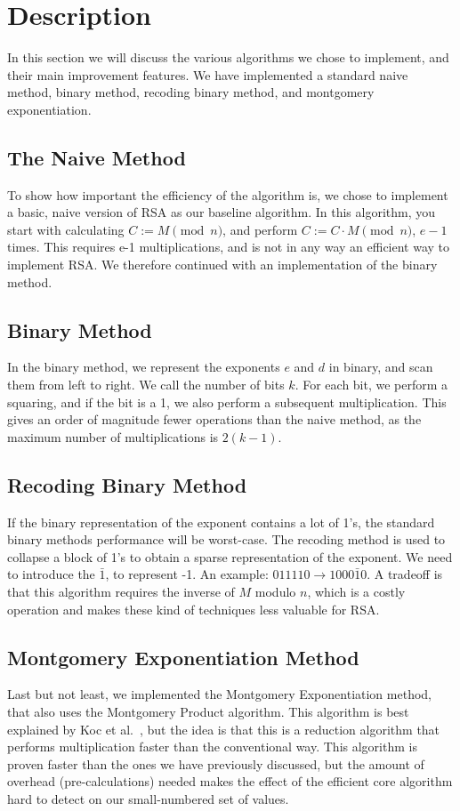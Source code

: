 \documentclass[twocolumn]{IEEEtran}
\begin{document}
\section{Description}
In this section we will discuss the various algorithms we chose to implement, and their main improvement features. We have implemented a standard naive method, binary method, recoding binary method, and montgomery exponentiation.

\subsection*{The Naive Method}
To show how important the efficiency of the algorithm is, we chose to implement a basic, naive version of RSA as our baseline algorithm. In this algorithm, you start with calculating $C := M \pmod{n}$, and perform $C := C \cdot M \pmod{n}$, $e-1$ times. This requires e-1 multiplications, and is not in any way an efficient way to implement RSA. We therefore continued with an implementation of the binary method.

\subsection*{Binary Method}
In the binary method, we represent the exponents $e$ and $d$ in binary, and scan them from left to right. We call the number of bits $k$. For each bit, we perform a squaring, and if the bit is a 1, we also perform a subsequent multiplication. This gives an order of magnitude fewer operations than the naive method, as the maximum number of multiplications is $2(k-1)$.

\subsection*{Recoding Binary Method}
If the binary representation of the exponent contains a lot of 1’s, the standard binary methods performance will be worst-case. The recoding method is used to collapse a block of 1’s to obtain a sparse representation of the exponent. We need to introduce the $\bar{1}$, to represent -1. An example: $011110 \rightarrow 1000\bar{1}0$. A tradeoff is that this algorithm requires the inverse of $M$ modulo $n$, which is a costly operation and makes these kind of techniques less valuable for RSA.

\subsection*{Montgomery Exponentiation Method}
Last but not least, we implemented the Montgomery Exponentiation method, that also uses the Montgomery Product algorithm. This algorithm is best explained by Koc et al.~\cite{koc}, but the idea is that this is a reduction algorithm that performs multiplication faster than the conventional way. This algorithm is proven faster than the ones we have previously discussed, but the amount of overhead (pre-calculations) needed makes the effect of the efficient core algorithm hard to detect on our small-numbered set of values.
\end{document}
